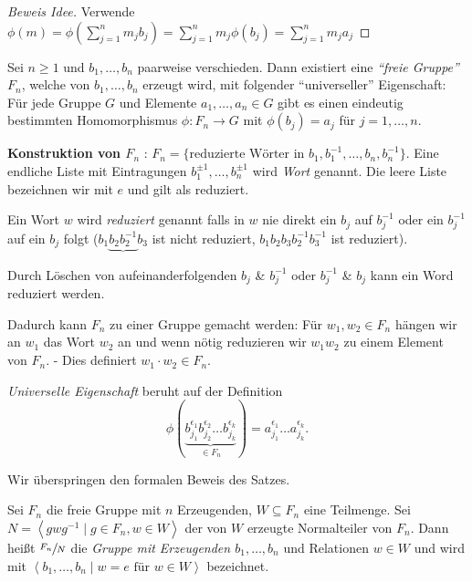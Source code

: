 \begin{proof}[Beweis Idee]
	Verwende $\phi(m) = \phi(\sum_{j=1}^{n} m_{j} b_{j}) = \sum_{j=1}^{n} m_{j} \phi(b_{j}) =\sum_{j=1}^{n} m_{j} a_{j}$
\end{proof}

\begin{theorem}
	Sei $n \geq 1$ und $b_1,\ldots,b_{n}$ paarweise verschieden. Dann existiert eine \emph{\enquote{freie Gruppe} $F_{n}$},
	welche von $b_1,\ldots,b_{n}$ erzeugt wird, mit folgender \enquote{universeller} Eigenschaft:
	Für jede Gruppe $G$ und Elemente $a_1,\ldots,a_{n} \in G$ gibt es einen eindeutig bestimmten Homomorphismus 
	$\phi: F_{n} \to G$ mit $\phi(b_{j}) = a_{j}$ für $j=1,\ldots,n$.
\end{theorem}

\textbf{Konstruktion von $F_{n}$ }:
$F_{n} = \{\text{reduzierte Wörter in } b_1, b_1^{-1},\ldots,b_{n},b_{n}^{-1}\}$.
Eine endliche Liste mit Eintragungen $b_1^{\pm 1},\ldots,b_{n}^{\pm 1}$ wird \emph{Wort} genannt.
Die leere Liste bezeichnen wir mit $e$ und gilt als reduziert.

Ein Wort $w$ wird \emph{reduziert} genannt falls in $w$ nie direkt ein $b_{j}$ auf $b_{j}^{-1}$ oder ein $b_{j}^{-1}$ auf ein $b_{j}$ folgt 
($b_1 \underbrace{b_2 b_2^{-1}} b_3$ ist nicht reduziert, $b_1 b_2 b_3 b_2^{-1} b_3^{-1}$ ist reduziert).

Durch Löschen von aufeinanderfolgenden $b_{j}$ \& $b_{j}^{-1}$ oder $b_{j}^{-1}$ \& $b_{j}$ kann ein Word reduziert werden.

Dadurch kann $F_{n}$ zu einer Gruppe gemacht werden:
Für $w_1, w_2 \in F_{n}$ hängen wir an $w_1$ das Wort $w_2$ an und wenn nötig reduzieren wir $w_1 w_2$ zu einem Element von $F_{n}$.
- Dies definiert $w_1 \cdot w_2 \in F_{n}$.

\emph{Universelle Eigenschaft} beruht auf der Definition
\[
	\phi(\underbrace{b_{j_1}^{\epsilon_1} b_{j_2}^{\epsilon_2} \ldots b_{j_{k}}^{\epsilon_{k}}}_{\in F_{n}}) = a_{j_1}^{\epsilon_1} \ldots a_{j_{k}}^{\epsilon_{k}}
.\]

Wir überspringen den formalen Beweis des Satzes.

\begin{definition}[Relation]
	Sei $F_{n}$ die freie Gruppe mit $n$ Erzeugenden, $W \subseteq F_{n}$ eine Teilmenge.
	Sei $N = \left< g w g^{-1} \mid g \in F_{n}, w \in W \right>$ der von $W$ erzeugte Normalteiler von $F_{n}$.
	Dann heißt $\sfrac{F_{n}}{N}$ die \emph{Gruppe mit Erzeugenden $b_1,\ldots,b_{n}$} und Relationen $w \in W$ 
	und wird mit $\left< b_1,\ldots,b_{n} \mid w = e \text{ für } w \in W \right>$ bezeichnet.
\end{definition}

